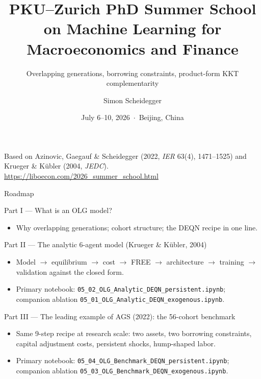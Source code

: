 \documentclass[aspectratio=169,11pt]{beamer}
\title[PKU--Zurich Summer School 2026]
{PKU--Zurich PhD Summer School on Machine Learning for Macroeconomics and Finance}
\subtitle{Overlapping generations, borrowing constraints, product-form KKT complementarity}
\author{Simon Scheidegger}
\institute{HEC Lausanne $\cdot$ University of Zurich}
\date{July 6--10, 2026 \,$\cdot$\, Beijing, China}
\begin{document}
{
\begin{frame}
\titlepage
\vspace{-0.4cm}
\begin{center}
{\footnotesize Based on Azinovic, Gaegauf \& Scheidegger (2022, \emph{IER} 63(4), 1471--1525) and Krueger \& K\"ubler (2004, \emph{JEDC}).}\\[8pt]
{\footnotesize \url{https://liboecon.com/2026_summer_school.html}}
\end{center}
\end{frame}
}

\begin{frame}{Roadmap}
\footnotesize
\begin{block}{Part I --- What is an OLG model?}
\vspace{-3pt}\begin{itemize}\itemsep0pt
    \item Why overlapping generations; cohort structure; the DEQN recipe in one line.
\end{itemize}
\end{block}
\vspace{-2pt}
\begin{block}{Part II --- The analytic 6-agent model (Krueger \& K\"ubler, 2004)}
\vspace{-3pt}\begin{itemize}\itemsep0pt
    \item Model $\to$ equilibrium $\to$ cost $\to$ FREE $\to$ architecture $\to$ training $\to$ validation against the closed form.
    \item Primary notebook: \texttt{05\_02\_OLG\_Analytic\_DEQN\_persistent.ipynb}; companion ablation \texttt{05\_01\_OLG\_Analytic\_DEQN\_exogenous.ipynb}.
\end{itemize}
\end{block}
\vspace{-2pt}
\begin{block}{Part III --- The leading example of AGS (2022): the 56-cohort benchmark}
\vspace{-3pt}\begin{itemize}\itemsep0pt
    \item Same 9-step recipe at research scale: two assets, two borrowing constraints, capital adjustment costs, persistent shocks, hump-shaped labor.
    \item Primary notebook: \texttt{05\_04\_OLG\_Benchmark\_DEQN\_persistent.ipynb}; companion ablation \texttt{05\_03\_OLG\_Benchmark\_DEQN\_exogenous.ipynb}.
\end{itemize}
\end{block}
\end{frame}
\end{document}
